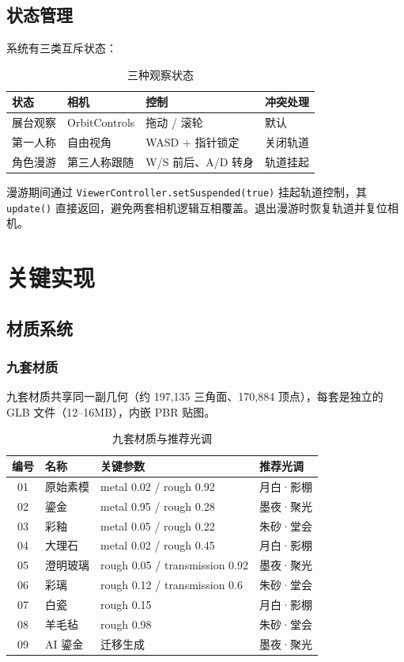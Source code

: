 \documentclass[UTF8,a4paper,11pt]{ctexart}
\begin{document}
\subsection{状态管理}
系统有三类互斥状态：

\begin{table}[H]
\centering
\small
\caption{三种观察状态}
\begin{tabular}{@{}llll@{}}
\toprule
状态 & 相机 & 控制 & 冲突处理 \\
\midrule
展台观察 & OrbitControls & 拖动 / 滚轮 & 默认 \\
第一人称 & 自由视角 & WASD + 指针锁定 & 关闭轨道 \\
角色漫游 & 第三人称跟随 & W/S 前后、A/D 转身 & 轨道挂起 \\
\bottomrule
\end{tabular}
\end{table}

漫游期间通过 \texttt{ViewerController.setSuspended(true)} 挂起轨道控制，其 \texttt{update()} 直接返回，避免两套相机逻辑互相覆盖。退出漫游时恢复轨道并复位相机。

\section{关键实现}

\subsection{材质系统}

\subsubsection{九套材质}
九套材质共享同一副几何（约 197{,}135 三角面、170{,}884 顶点），每套是独立的 GLB 文件（12--16MB），内嵌 PBR 贴图。

\begin{table}[H]
\centering
\small
\caption{九套材质与推荐光调}
\begin{tabular}{@{}clll@{}}
\toprule
编号 & 名称 & 关键参数 & 推荐光调 \\
\midrule
01 & 原始素模 & metal 0.02 / rough 0.92 & 月白·影棚 \\
02 & 鎏金 & metal 0.95 / rough 0.28 & 墨夜·聚光 \\
03 & 彩釉 & metal 0.05 / rough 0.22 & 朱砂·堂会 \\
04 & 大理石 & metal 0.02 / rough 0.45 & 月白·影棚 \\
05 & 澄明玻璃 & rough 0.05 / transmission 0.92 & 墨夜·聚光 \\
06 & 彩璃 & rough 0.12 / transmission 0.6 & 朱砂·堂会 \\
07 & 白瓷 & rough 0.15 & 月白·影棚 \\
08 & 羊毛毡 & rough 0.98 & 朱砂·堂会 \\
09 & AI 鎏金 & 迁移生成 & 墨夜·聚光 \\
\bottomrule
\end{tabular}
\end{table}
\end{document}

